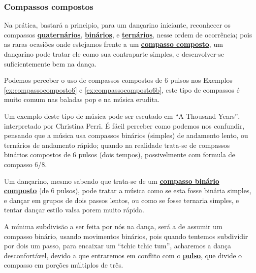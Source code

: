 \subsubsection{Compassos compostos}
Na prática, bastará a principio, para um dançarino iniciante,
reconhecer os compassos \hyperref[subsec:compassoquaternario]{\textbf{quaternários}}, 
\hyperref[subsec:compassobinario]{\textbf{binários}}, e 
\hyperref[subsec:compassoternario]{\textbf{ternários}},
nesse ordem de ocorrência;
pois as raras ocasiões onde estejamos frente a um \hyperref[sec:compaso]{\textbf{compasso composto}},
um dançarino pode tratar ele como sua contraparte simples,
e desenvolver-se suficientemente bem na dança. 

Podemos perceber o uso de compassos compostos de 6 pulsos nos Exemplos \ref{ex:compassocomposto6}
e \ref{ex:compassocomposto6b},
este tipo de compassos é muito comum nas baladas pop e na música erudita.
\begin{example}
\label{ex:compassocomposto6}
Um exemplo deste tipo de música pode ser escutado em ``A Thousand Years'', 
interpretado por Christina Perri. É fácil perceber como podemos nos confundir,
pensando que a música usa compassos binários (simples) de andamento lento,
ou ternários de andamento rápido; quando na realidade trata-se de compassos binários compostos de 6 pulsos (dois tempos),
possivelmente com formula de compasso 6/8.

Um dançarino, mesmo sabendo que trata-se de um \hyperref[compasso:binario]{\textbf{compasso binário composto}} (de 6 pulsos),
pode tratar a música como se esta fosse binária simples, e dançar em grupos de dois passos lentos,
ou como se fosse ternaria simples, e tentar dançar estilo valsa porem muito rápida.

A mínima subdivisão a ser feita por nós na dança, 
será a de assumir um compasso binário, usando movimentos binários,
pois quando tentemos subdividir por dois um passo, para encaixar um ``tchic tchic tum'',
acharemos a dança desconfortável, devido a que
entraremos em conflito com o \hyperref[ref:Pulso]{\textbf{pulso}}, 
que divide o compasso em porções múltiplos de três.
  
\end{example}

